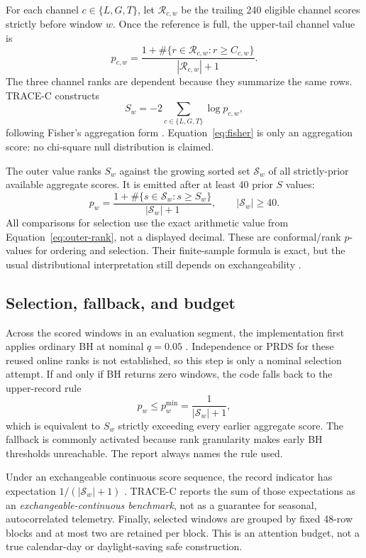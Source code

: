 For each channel $c\in\{L,G,T\}$, let $\mathcal R_{c,w}$ be the trailing 240
eligible channel scores strictly before window $w$. Once the reference is full,
the upper-tail channel value is
\begin{equation}
 p_{c,w}=\frac{1+\#\{r\in\mathcal R_{c,w}:r\geq C_{c,w}\}}
 {|\mathcal R_{c,w}|+1}.
 \label{eq:channel-rank}
\end{equation}
The three channel ranks are dependent because they summarize the same rows.
TRACE-C constructs
\begin{equation}
 S_w=-2\sum_{c\in\{L,G,T\}}\log p_{c,w},
 \label{eq:fisher}
\end{equation}
following Fisher's aggregation form \citep{fisher1932statisticalmethods}.
Equation~\eqref{eq:fisher} is only an aggregation score: no chi-square null
distribution is claimed.

The outer value ranks $S_w$ against the growing sorted set
$\mathcal S_w$ of all strictly-prior available aggregate scores. It is emitted
after at least 40 prior $S$ values:
\begin{equation}
 p_w=\frac{1+\#\{s\in\mathcal S_w:s\geq S_w\}}
 {|\mathcal S_w|+1},\qquad |\mathcal S_w|\geq40.
 \label{eq:outer-rank}
\end{equation}
All comparisons for selection use the exact arithmetic value from
Equation~\eqref{eq:outer-rank}, not a displayed decimal. These are
conformal/rank $p$-values for ordering and selection. Their finite-sample
formula is exact, but the usual distributional interpretation still depends
on exchangeability \citep{shafer2008tutorial}.

\subsection{Selection, fallback, and budget}

Across the scored windows in an evaluation segment, the implementation first
applies ordinary BH at nominal $q=0.05$ \citep{benjamini1995fdr}. Independence
or PRDS for these reused online ranks is not established, so this step is only
a nominal selection attempt. If and only if BH returns zero windows, the code
falls back to the upper-record rule
\begin{equation}
 p_w\leq p^{\min}_w=\frac{1}{|\mathcal S_w|+1},
\end{equation}
which is equivalent to $S_w$ strictly exceeding every earlier aggregate score.
The fallback is commonly activated because rank granularity makes early BH
thresholds unreachable. The report
always names the rule used.

Under an exchangeable continuous score sequence, the record indicator has
expectation $1/(|\mathcal S_w|+1)$ \citep{renyi1962records}. TRACE-C reports
the sum of those expectations as an \emph{exchangeable-continuous benchmark},
not as a guarantee for seasonal, autocorrelated telemetry. Finally, selected
windows are grouped by fixed 48-row blocks and at most two are retained per
block. This is an attention budget, not a true calendar-day or daylight-saving
safe construction.
